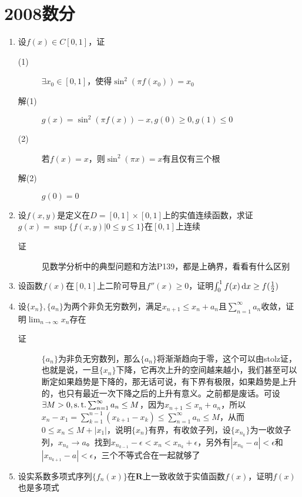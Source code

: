 \section{2008数分}
\begin{enumerate}
\item 设$f(x)\in C[0,1]$，证
\begin{description}
\item[(1)] $\exists x_0 \in [0,1]$，使得$\sin^2(\pi f(x_0))=x_0$
\item[解(1)] $g(x) = \sin^2(\pi f(x)) - x,g(0)\geq 0,g(1)\leq 0$
\item[(2)] 若$f(x)=x$，则$\sin^2(\pi x)=x$有且仅有三个根
\item[解(2)] $g(0)=0$
\end{description}

\item 设$f(x,y)$是定义在$D=[0,1]\times [0,1]$上的实值连续函数，求证$g(x)=\sup\{f(x,y)|0\leq y \leq 1\}$在$[0,1]$上连续
\begin{description}
\item[证] 见数学分析中的典型问题和方法P139，都是上确界，看看有什么区别
\end{description}

\item 设函数$f(x)$在$[0,1]$上二阶可导且$f''(x)\geq 0$，证明$\int_0^1 f(x)\,\mathrm{d} x\geq f(\frac{1}{2})$

\item 设$\{x_n\},\{a_n\}$为两个非负无穷数列，满足$x_{n+1}\leq x_n +a_n$且$\sum_{n=1}^\infty a_n$收敛，证明$\lim_{n \to \infty}x_n$存在
\begin{description}
\item[证] $\{a_n\}$为非负无穷数列，那么$\{a_n\}$将渐渐趋向于零，这个可以由stolz证，也就是说，一旦$\{x_n\}$下降，它再次上升的空间越来越小，我们甚至可以断定如果趋势是下降的，那无话可说，有下界有极限，如果趋势是上升的，也只有最近一次下降之后的上升有意义。之前都是废话。可设$\exists M>0,\operatorname{s.t.} \sum_{n=1}^\infty a_n \leq M$，因为$x_{n+1}\leq x_n +a_n$，所以$x_n-x_1=\sum_{k=1}^{n-1}(x_{k+1}-x_k)\leq \sum_{n=1}^\infty a_n \leq M$，从而$0\leq x_n\leq M+|x_1|$，说明$\{x_n\}$有界，有收敛子列，设$\{x_{n_k}\}$为一收敛子列，$x_{n_k}\to a$。找到$x_{n_{k-1}}-\epsilon<x_n<x_{n_{k}}+\epsilon$，另外有$|x_{n_{k}}-a|<\epsilon$和$|x_{n_{k+1}}-a|<\epsilon$，三个不等式合在一起就够了
\end{description}

\item 设实系数多项式序列$\{f_n(x)\}$在$\mathbf{R}$上一致收敛于实值函数$f(x)$，证明$f(x)$也是多项式


\end{enumerate}
